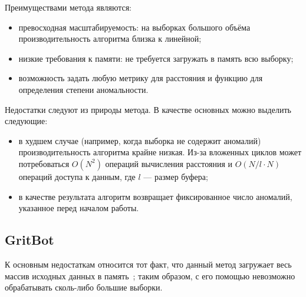 Преимуществами метода являются:
\begin{itemize}
	\item превосходная масштабируемость: на выборках большого объёма производительность алгоритма близка к линейной;
	\item низкие требования к памяти: не требуется загружать в память всю выборку;
	\item возможность задать любую метрику для расстояния и функцию для определения степени аномальности.
\end{itemize}

Недостатки следуют из природы метода. В качестве основных можно выделить следующие:
\begin{itemize}
	\item в худшем случае (например, когда выборка не содержит аномалий) производительность алгоритма крайне низкая. Из-за вложенных циклов может потребоваться $O(N^2)$ операций вычисления расстояния и $O(N/l \cdot N)$ операций доступа к данным, где $l$ --- размер буфера;
	\item в качестве результата алгоритм возвращает фиксированное число аномалий, указанное перед началом работы.
\end{itemize}

\subsection{GritBot}
К основным недостаткам относится тот факт, что данный метод загружает весь массив исходных данных в память~\cite{BaySchwabacherOrca}; таким образом, с его помощью невозможно обрабатывать сколь-либо большие выборки.